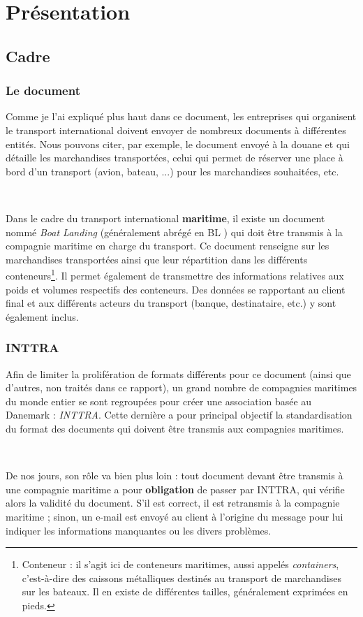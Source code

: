 \chapter{Présentation}
\section{Cadre}
\subsection{Le document}
Comme je l'ai expliqué plus haut dans ce document, les entreprises qui organisent le transport international doivent envoyer de nombreux documents à différentes entités. Nous pouvons citer, par exemple, le document envoyé à la douane et qui détaille les marchandises transportées, celui qui permet de réserver une place à bord d'un transport (avion, bateau, ...) pour les marchandises souhaitées, etc.

~

Dans le cadre du transport international \textbf{maritime}, il existe un document nommé \emph{Boat Landing} (généralement abrégé en \og BL \fg) qui doit être transmis à la compagnie maritime en charge du transport. Ce document renseigne sur les marchandises transportées ainsi que leur répartition dans les différents conteneurs\footnote{Conteneur : il s'agit ici de conteneurs maritimes, aussi appelés \emph{containers}, c'est-à-dire des caissons métalliques destinés au transport de marchandises sur les bateaux. Il en existe de différentes tailles, généralement exprimées en pieds.}. Il permet également de transmettre des informations relatives aux poids et volumes respectifs des conteneurs. Des données se rapportant au client final et aux différents acteurs du transport (banque, destinataire, etc.) y sont également inclus.


\subsection{INTTRA}
Afin de limiter la prolifération de formats différents pour ce document (ainsi que d'autres, non traités dans ce rapport), un grand nombre de compagnies maritimes du monde entier se sont regroupées pour créer une association basée au Danemark : \emph{INTTRA}. Cette dernière a pour principal objectif la standardisation du format des documents qui doivent être transmis aux compagnies maritimes.

~

De nos jours, son rôle va bien plus loin : tout document devant être transmis à une compagnie maritime a pour \textbf{obligation} de passer par INTTRA, qui vérifie alors la validité du document. S'il est correct, il est retransmis à la compagnie maritime ; sinon, un e-mail est envoyé au client à l'origine du message pour lui indiquer les informations manquantes ou les divers problèmes.

